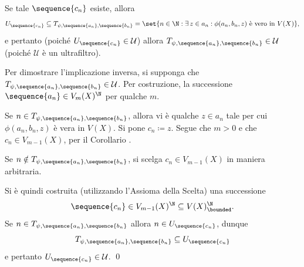 {\begin{itemize}
        Se tale $ \sequence{c_{n} } $ esiste, allora \begin{equation*}
            U_{\sequence{c_{n} }} \subseteq T_{\psi, \sequence{a_{n}},\sequence{b_{n}}} = \set{n \in \N: \exists\, z \in a_{n}: \phi(a_{n}, b_{n}, z  ) \text{ è vero in }V(X)},   
        \end{equation*}e pertanto (poiché $ U_{\sequence{c_{n} }} \in \mathcal{U} $) allora $ T_{\psi, \sequence{a_{n}},\sequence{b_{n}}} \in \mathcal{U} $ (poiché $ \mathcal{U} $ è un ultrafiltro). 

        Per dimostrare l'implicazione inversa, si supponga che $ T_{\psi, \sequence{a_{n}},\sequence{b_{n}}} \in \mathcal{U} $. Per costruzione, la successione $ \sequence{a_{n} } \in V_{m}(X)^{\N}  $ per qualche $ m $. 
        
        Se $ n \in T_{\psi, \sequence{a_{n}},\sequence{b_{n}}} $, allora vi è qualche $ z \in a_{n}  $ tale per cui $ \phi(a_{n}, b_{n}, z) $ è vera in $ V(X) $. Si pone $ c_{n} \coloneqq z  $. Segue che $ m>0 $ e che $ c_{n} \in V_{m-1}(X)  $, per il Corollario . 

        Se $ n \notin T_{\psi, \sequence{a_{n}},\sequence{b_{n}}}$, si scelga $ c_{n} \in V_{m-1}(X) $ in maniera arbitraria. 

        Si è quindi costruita (utilizzando l'Assioma della Scelta) una successione \[\sequence{c_{n} } \in V_{m-1}(X)^{\N} \subseteq V(X)^{\N}_{\bounded}.\]Se $ n \in T_{\psi, \sequence{a_{n}},\sequence{b_{n}}} $ allora $ n \in U_{\sequence{c_{n}}}  $, dunque \begin{equation*}
            T_{\psi, \sequence{a_{n}},\sequence{b_{n}}} \subseteq U_{\sequence{c_{n}} } 
        \end{equation*}e pertanto $ U_{\sequence{c_{n} }} \in \mathcal{U} $.
    \qed\end{itemize}
}
